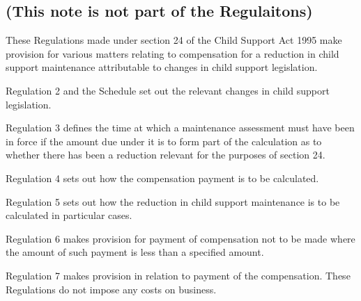 \documentclass[12pt,a4paper]{article}
\begin{document}
\subsection*{(This note is not part of the Regulaitons)}

These Regulations made under section 24 of the Child Support Act 1995 make provision for various matters relating to compensation for a reduction in child support maintenance attributable to changes in child support legislation.

  Regulation 2 and the Schedule set out the relevant changes in child support legislation.

  Regulation 3 defines the time at which a maintenance assessment must have been in force if the amount due under it is to form part of the calculation as to whether there has been a reduction relevant for the purposes of section 24.

  Regulation 4 sets out how the compensation payment is to be calculated.

  Regulation 5 sets out how the reduction in child support maintenance is to be calculated in particular cases.

  Regulation 6 makes provision for payment of compensation not to be made where the amount of such payment is less than a specified amount.

  Regulation 7 makes provision in relation to payment of the compensation.
  These Regulations do not impose any costs on business.
\end{document}
